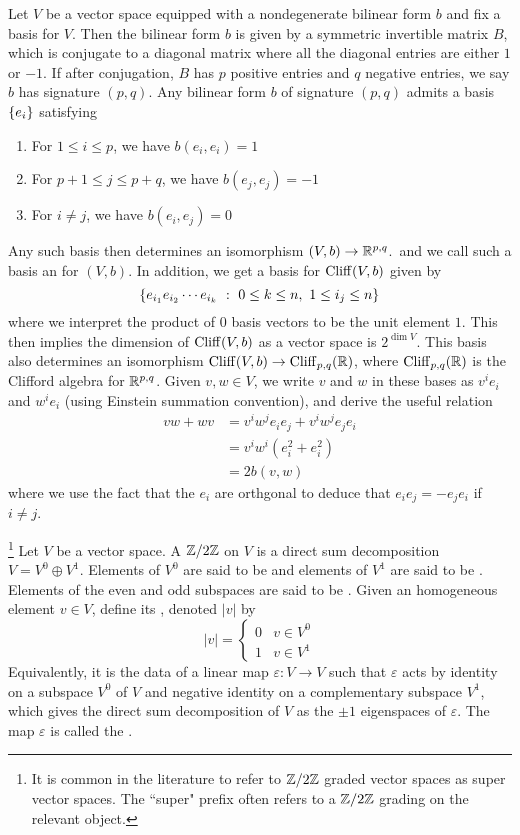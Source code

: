 %
Let $V$ be a vector space equipped with a nondegenerate bilinear form $b$ and
fix a basis for $V$. Then the bilinear form $b$ is given by a symmetric
invertible matrix $B$, which is conjugate to a diagonal matrix where all
the diagonal entries are either $1$ or $-1$. If after conjugation, $B$ has
$p$ positive entries and $q$ negative entries, we say $b$ has signature $(p,q)$.
Any bilinear form $b$ of signature $(p,q)$ admits a basis $\left\lbrace e_i \right\rbrace$ satisfying
%
\begin{enumerate}
  \item For $1 \leq i \leq p$, we have $b(e_i,e_i) = 1$
  \item For $p+1 \leq j \leq p+q$, we have $b(e_j,e_j) = -1$
  \item For $i \neq j$, we have $b(e_i,e_j) = 0$
\end{enumerate}
%
Any such basis then determines an isomorphism $(V,b) \to \mathbb{R}^{p,q}$.\, and we
call such a basis an  for $(V,b)$.
In addition, we get a basis for $\operatorname{Cliff}(V,b)$ given by
\[
\left\lbrace e_{i_1}e_{i_2}\cdots e_{i_k}~:~ 0 \leq k \leq n, ~ 1 \leq i_j \leq n \right\rbrace
\]
where we interpret the product of $0$ basis vectors to be the unit element $1$.
This then implies the dimension of $\operatorname{Cliff}(V,b)$ as a vector space is
$2^{\dim V}$. This basis also determines an isomorphism
$\operatorname{Cliff}(V,b) \to \operatorname{Cliff}_{p,q}(\mathbb{R})$, where $\operatorname{Cliff}_{p,q}(\mathbb{R})$ is the Clifford
algebra for $\mathbb{R}^{p,q}$. Given $v,w \in V$, we write $v$ and $w$ in these
bases as $v^ie_i$ and $w^ie_i$ (using Einstein summation convention),
and derive the useful relation
%
\begin{align*}
vw + wv &= v^iw^je_ie_j + v^iw^je_je_i \\
&= v^iw^i(e_i^2 + e_i^2) \\
&= 2b(v,w)
\end{align*}
where we use the fact that the $e_i$ are orthgonal to deduce that $e_ie_j = -e_je_i$
if $i \neq j$.
%
\begin{defn}\footnote{It is common in the literature to refer to $\mathbb{Z}/2\mathbb{Z}$
graded vector spaces as super vector spaces. The ``super" prefix often refers
to a $\mathbb{Z}/2\mathbb{Z}$ grading on the relevant object.}
Let $V$ be a vector space. A $\mathbb{Z} /2\mathbb{Z}$  on $V$ is a direct sum
decomposition $V = V^0 \oplus V^1$. Elements of $V^0$ are said to be 
and elements of $V^1$ are said to be . Elements of the even and odd
subspaces are said to be . Given an homogeneous element
$v \in V$, define its , denoted $|v|$ by
\[
|v| = \begin{cases}
0 & v \in V^0 \\
1 & v \in V^1
\end{cases}
\]
Equivalently, it is the data of a linear map
$\varepsilon : V \to V$ such that $\varepsilon$ acts by identity on a subspace $V^0$
of $V$ and negative identity on a complementary subspace $V^1$, which gives the
direct sum decomposition of $V$ as the $\pm 1$ eigenspaces of $\varepsilon$.
The map $\varepsilon$ is called the .

\end{defn}

